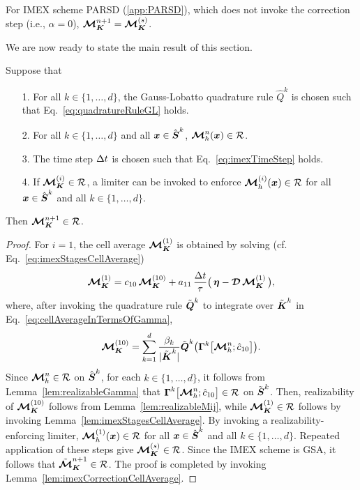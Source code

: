 \begin{rem}
  For IMEX scheme PARSD (\ref{app:PARSD}), which does not invoke the correction step (i.e., $\alpha=0$), $\boldsymbol{\mathcal{M}}_{\boldsymbol{K}}^{n+1}=\boldsymbol{\mathcal{M}}_{\boldsymbol{K}}^{(s)}$.  
\end{rem}

We are now ready to state the main result of this section.  
\begin{theorem}
  Suppose that
  \begin{itemize}
    \item[1.] For all $k\in\{1,\ldots,d\}$, the Gauss-Lobatto quadrature rule $\hat{Q}^{k}$ is chosen such that Eq.~\eqref{eq:quadratureRuleGL} holds.  
    \item[2.] For all $k\in\{1,\ldots,d\}$ and all $\boldsymbol{x}\in\hat{\boldsymbol{S}}^{k}$, $\boldsymbol{\mathcal{M}}_{h}^{n}(\boldsymbol{x})\in\mathcal{R}$.
    \item[3.] The time step $\Delta t$ is chosen such that Eq.~\eqref{eq:imexTimeStep} holds.  
    \item[4.] If $\boldsymbol{\mathcal{M}}_{\boldsymbol{K}}^{(i)}\in\mathcal{R}$, a limiter can be invoked to enforce $\boldsymbol{\mathcal{M}}_{h}^{(i)}(\boldsymbol{x})\in\mathcal{R}$ for all $\boldsymbol{x}\in\hat{\boldsymbol{S}}^{k}$ and all $k\in\{1,\ldots,d\}$.
  \end{itemize}
  Then $\boldsymbol{\mathcal{M}}_{\boldsymbol{K}}^{n+1}\in\mathcal{R}$.  
  \label{the:realizableDGIMEX}
\end{theorem}
\begin{proof}
  For $i=1$, the cell average $\boldsymbol{\mathcal{M}}_{\boldsymbol{K}}^{(1)}$ is obtained by solving (cf. Eq.~\eqref{eq:imexStagesCellAverage})
  \begin{equation*}
    \boldsymbol{\mathcal{M}}_{\boldsymbol{K}}^{(1)}=c_{10}\,\boldsymbol{\mathcal{M}}_{\boldsymbol{K}}^{(10)}+a_{11}\,\frac{\Delta t}{\tau}\big(\,\boldsymbol{\eta}-\boldsymbol{\mathcal{D}}\,\boldsymbol{\mathcal{M}}_{\boldsymbol{K}}^{(1)}\,\big),
  \end{equation*}
  where, after invoking the quadrature rule $\tilde{\boldsymbol{Q}}^{k}$ to integrate over $\tilde{\boldsymbol{K}}^{k}$ in Eq.~\eqref{eq:cellAverageInTermsOfGamma},
  \begin{equation*}
    \boldsymbol{\mathcal{M}}_{\boldsymbol{K}}^{(10)}
    =\sum_{k=1}^{d}\frac{\beta_{k}}{|\tilde{\boldsymbol{K}}^{k}|}\tilde{\boldsymbol{Q}}^{k}\big(\boldsymbol{\Gamma}^{k}\big[\boldsymbol{\mathcal{M}}_{h}^{n};\hat{c}_{10}\big]\big).  
  \end{equation*}
  Since $\boldsymbol{\mathcal{M}}_{h}^{n}\in\mathcal{R}$ on $\hat{\boldsymbol{S}}^{k}$, for each $k\in\{1,\ldots,d\}$, it follows from Lemma~\ref{lem:realizableGamma} that $\boldsymbol{\Gamma}^{k}\big[\boldsymbol{\mathcal{M}}_{h}^{n};\hat{c}_{10}\big]\in\mathcal{R}$ on $\tilde{\boldsymbol{S}}^{k}$.  
  Then, realizability of $\boldsymbol{\mathcal{M}}_{\boldsymbol{K}}^{(10)}$ follows from Lemma~\ref{lem:realizableMij}, while $\boldsymbol{\mathcal{M}}_{\boldsymbol{K}}^{(1)}\in\mathcal{R}$ follows by invoking Lemma~\ref{lem:imexStagesCellAverage}.  
  By invoking a realizability-enforcing limiter, $\boldsymbol{\mathcal{M}}_{h}^{(1)}(\boldsymbol{x})\in\mathcal{R}$ for all $\boldsymbol{x}\in\hat{\boldsymbol{S}}^{k}$ and all $k\in\{1,\ldots,d\}$.  
  Repeated application of these steps give $\boldsymbol{\mathcal{M}}_{\boldsymbol{K}}^{(s)}\in\mathcal{R}$.  
  Since the IMEX scheme is GSA, it follows that $\tilde{\boldsymbol{\mathcal{M}}}_{\boldsymbol{K}}^{n+1}\in\mathcal{R}$.  
  The proof is completed by invoking Lemma~\ref{lem:imexCorrectionCellAverage}.  
\end{proof}